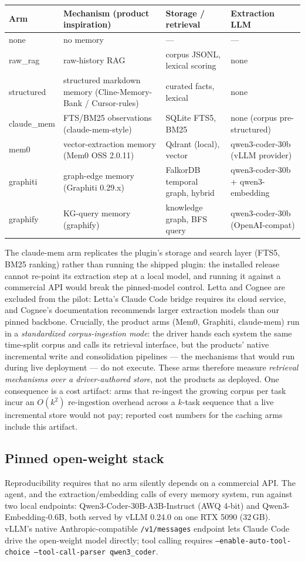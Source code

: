 \documentclass[11pt]{article}
\begin{document}
\begin{center}
\small
\begin{tabular}{llll}
\toprule
Arm & Mechanism (product inspiration) & Storage / retrieval & Extraction LLM \\
\midrule
none & no memory & --- & --- \\
raw\_rag & raw-history RAG & corpus JSONL, lexical scoring & none \\
structured & structured markdown memory (Cline-Memory-Bank / Cursor-rules) & curated facts, lexical & none \\
claude\_mem & FTS/BM25 observations (claude-mem-style) & SQLite FTS5, BM25 & none (corpus pre-structured) \\
mem0 & vector-extraction memory (Mem0 OSS 2.0.11) & Qdrant (local), vector & qwen3-coder-30b (vLLM provider) \\
graphiti & graph-edge memory (Graphiti 0.29.x) & FalkorDB temporal graph, hybrid & qwen3-coder-30b + qwen3-embedding \\
graphify & KG-query memory (graphify) & knowledge graph, BFS query & qwen3-coder-30b (OpenAI-compat) \\
\bottomrule
\end{tabular}
\end{center}

The claude-mem arm replicates the plugin's storage and search layer (FTS5, BM25 ranking) rather than running the shipped plugin: the installed release cannot re-point its extraction step at a local model, and running it against a commercial API would break the pinned-model control. Letta and Cognee are excluded from the pilot: Letta's Claude Code bridge requires its cloud service, and Cognee's documentation recommends larger extraction models than our pinned backbone. Crucially, the product arms (Mem0, Graphiti, claude-mem) run in a \emph{standardized corpus-ingestion mode}: the driver hands each system the same time-split corpus and calls its retrieval interface, but the products' native incremental write and consolidation pipelines --- the mechanisms that would run during live deployment --- do not execute. These arms therefore measure \emph{retrieval mechanisms over a driver-authored store}, not the products as deployed. One consequence is a cost artifact: arms that re-ingest the growing corpus per task incur an $O(k^2)$ re-ingestion overhead across a $k$-task sequence that a live incremental store would not pay; reported cost numbers for the caching arms include this artifact.

\subsection{Pinned open-weight stack}
Reproducibility requires that no arm silently depends on a commercial API. The agent, and the extraction/embedding calls of every memory system, run against two local endpoints: Qwen3-Coder-30B-A3B-Instruct (AWQ 4-bit) and Qwen3-Embedding-0.6B, both served by vLLM 0.24.0 on one RTX 5090 (32\,GB). vLLM's native Anthropic-compatible \texttt{/v1/messages} endpoint lets Claude Code drive the open-weight model directly; tool calling requires \texttt{--enable-auto-tool-choice --tool-call-parser qwen3\_coder}.
\end{document}

